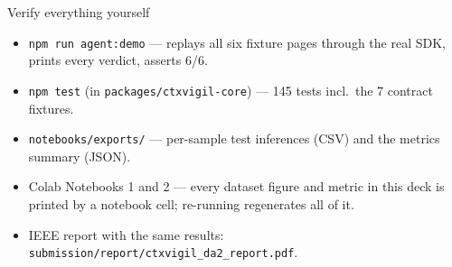 \documentclass[aspectratio=169]{beamer}
\begin{document}
\begin{frame}{Verify everything yourself}
\begin{itemize}
  \item \texttt{npm run agent:demo} --- replays all six fixture pages through the real SDK, prints every verdict, asserts 6/6.
  \item \texttt{npm test} (in \texttt{packages/ctxvigil-core}) --- 145 tests incl.\ the 7 contract fixtures.
  \item \texttt{notebooks/exports/} --- per-sample test inferences (CSV) and the metrics summary (JSON).
  \item Colab Notebooks 1 and 2 --- every dataset figure and metric in this deck is printed by a notebook cell; re-running regenerates all of it.
  \item IEEE report with the same results: \texttt{submission/report/ctxvigil\_da2\_report.pdf}.
\end{itemize}
\end{frame}
\end{document}
